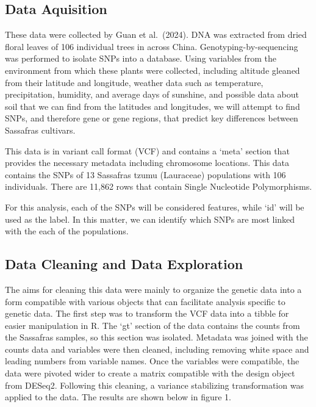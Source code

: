 \documentclass[
]{article}
\begin{document}
\subsection{Data Aquisition}\label{data-aquisition}

These data were collected by Guan et al.~(2024). DNA was extracted from
dried floral leaves of 106 individual trees in across China.
Genotyping-by-sequencing was performed to isolate SNPs into a database.
Using variables from the environment from which these plants were
collected, including altitude gleaned from their latitude and longitude,
weather data such as temperature, precipitation, humidity, and average
days of sunshine, and possible data about soil that we can find from the
latitudes and longitudes, we will attempt to find SNPs, and therefore
gene or gene regions, that predict key differences between Sassafras
cultivars.

This data is in variant call format (VCF) and contains a `meta' section
that provides the necessary metadata including chromosome locations.
This data contains the SNPs of 13 Sassafras tzumu (Lauraceae)
populations with 106 individuals. There are 11,862 rows that contain
Single Nucleotide Polymorphisms.

For this analysis, each of the SNPs will be considered features, while
`id' will be used as the label. In this matter, we can identify which
SNPs are most linked with the each of the populations.

\subsection{Data Cleaning and Data
Exploration}\label{data-cleaning-and-data-exploration}

The aims for cleaning this data were mainly to organize the genetic data
into a form compatible with various objects that can facilitate analysis
specific to genetic data. The first step was to transform the VCF data
into a tibble for easier manipulation in R. The `gt' section of the data
contains the counts from the Sassafras samples, so this section was
isolated. Metadata was joined with the counts data and variables were
then cleaned, including removing white space and leading numbers from
variable names. Once the variables were compatible, the data were
pivoted wider to create a matrix compatible with the design object from
DESeq2. Following this cleaning, a variance stabilizing transformation
was applied to the data. The results are shown below in figure 1.
\end{document}
